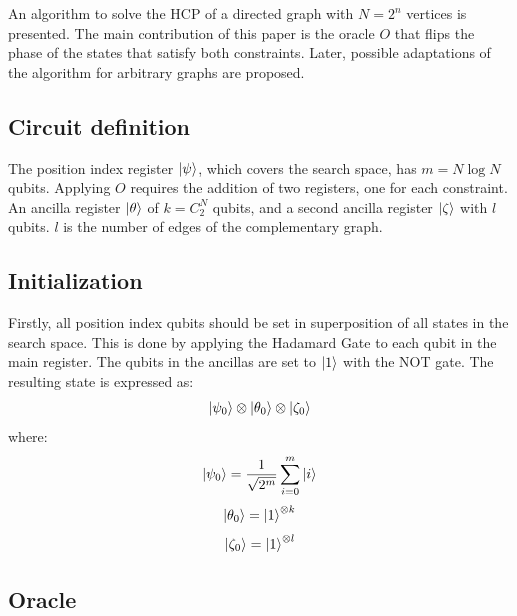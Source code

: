 \documentclass[10pt,a4paper]{article}
\begin{document}
An algorithm to solve the HCP of a directed graph with $N = 2^n$ vertices is presented. The main contribution of this paper is the oracle $O$ that flips the phase of the states that satisfy both constraints. Later, possible adaptations of the algorithm for arbitrary graphs are proposed.

\subsection{Circuit definition}
The position index register $\ket{\psi}$, which covers the search space, has $m = N\log N$ qubits. Applying $O$ requires the addition of two registers, one for each constraint. An ancilla register $\ket{\theta}$ of $k = C^N_2$ qubits, and a second ancilla register $\ket{\zeta}$ with $l$ qubits. $l$ is the number of edges of the  complementary graph.

\subsection{Initialization}
Firstly, all position index qubits should be set in superposition of all states in the search space. This is done by applying the Hadamard Gate to each qubit in the main register. The qubits in the ancillas are set to $\ket{1}$ with the NOT gate. The resulting state is expressed as:
$$\ket{\psi_0} \otimes \ket{\theta_0} \otimes \ket{\zeta_0}$$
where:
$$\ket{\psi_0} = \frac{1}{\sqrt{2^m}}\sum_{i=0}^{m} \ket{i}$$
$$\ket{\theta_0} = \ket{1}^{\otimes k}$$
$$\ket{\zeta_0} = \ket{1}^{\otimes l}$$

\subsection{Oracle}
\end{document}
